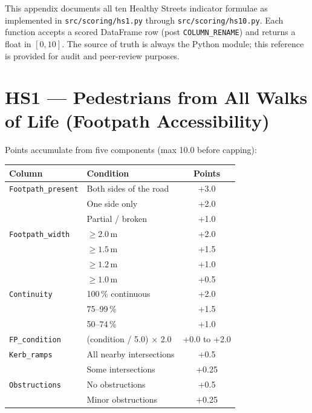 \documentclass[11pt,a4paper,openany]{book}
\begin{document}
This appendix documents all ten Healthy Streets indicator formulae as implemented in
\texttt{src/scoring/hs1.py} through \texttt{src/scoring/hs10.py}.  Each function
accepts a scored DataFrame row (post \texttt{COLUMN\_RENAME}) and returns a float in
$[0, 10]$.  The source of truth is always the Python module; this reference is provided
for audit and peer-review purposes.

\section*{HS1 --- Pedestrians from All Walks of Life (Footpath Accessibility)}

Points accumulate from five components (max 10.0 before capping):

\begin{center}
\begin{tabular}{lL{7cm}c}
\toprule
Column & Condition & Points \\
\midrule
\texttt{Footpath\_present} & Both sides of the road & +3.0 \\
                            & One side only           & +2.0 \\
                            & Partial / broken        & +1.0 \\
\texttt{Footpath\_width}   & $\ge 2.0$\,m            & +2.0 \\
                            & $\ge 1.5$\,m            & +1.5 \\
                            & $\ge 1.2$\,m            & +1.0 \\
                            & $\ge 1.0$\,m            & +0.5 \\
\texttt{Continuity}         & 100\,\% continuous      & +2.0 \\
                            & 75--99\,\%              & +1.5 \\
                            & 50--74\,\%              & +1.0 \\
\texttt{FP\_condition}      & (condition / 5.0) $\times$ 2.0 & +0.0 to +2.0 \\
\texttt{Kerb\_ramps}        & All nearby intersections & +0.5 \\
                            & Some intersections      & +0.25 \\
\texttt{Obstructions}       & No obstructions         & +0.5 \\
                            & Minor obstructions      & +0.25 \\
\bottomrule
\end{tabular}
\end{center}
\end{document}
